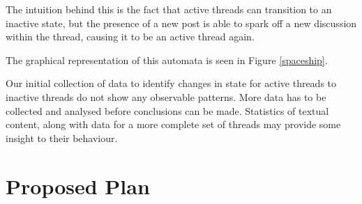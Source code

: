 \documentclass[]{homework}
\begin{document}
The intuition behind this is the fact that active threads can transition to an inactive state, but the presence of a new post is able to spark off a new discussion within the thread, causing it to be an active thread again.

The graphical representation of this automata is seen in Figure \ref{spaceship}.


Our initial collection of data to identify changes in state for active threads to inactive threads do not show any observable patterns. More data has to be collected and analysed before conclusions can be made. Statistics of textual content, along with data for a more complete set of threads may provide some insight to their behaviour.


\section{Proposed Plan}
\end{document}
